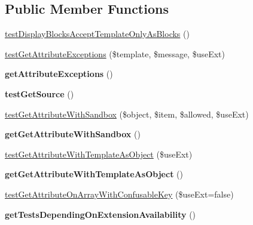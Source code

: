 \subsection*{Public Member Functions}
\begin{DoxyCompactItemize}
\item 
\hyperlink{classTwig__Tests__TemplateTest_a616e3dd27a87fa145276f1843568d180}{test\+Display\+Blocks\+Accept\+Template\+Only\+As\+Blocks} ()
\item 
\hyperlink{classTwig__Tests__TemplateTest_a203d0c14e730dc4385a8da7f78a789e9}{test\+Get\+Attribute\+Exceptions} (\$template, \$message, \$use\+Ext)
\item 
{\bfseries get\+Attribute\+Exceptions} ()\hypertarget{classTwig__Tests__TemplateTest_ab715715b3547c50918a3bacde5c01c6b}{}\label{classTwig__Tests__TemplateTest_ab715715b3547c50918a3bacde5c01c6b}

\item 
{\bfseries test\+Get\+Source} ()\hypertarget{classTwig__Tests__TemplateTest_a6916a32e0484bbf3fb1b6c1f16ddc2c4}{}\label{classTwig__Tests__TemplateTest_a6916a32e0484bbf3fb1b6c1f16ddc2c4}

\item 
\hyperlink{classTwig__Tests__TemplateTest_a95bc8d3e8c67696a9d63a2ee9eef031a}{test\+Get\+Attribute\+With\+Sandbox} (\$object, \$item, \$allowed, \$use\+Ext)
\item 
{\bfseries get\+Get\+Attribute\+With\+Sandbox} ()\hypertarget{classTwig__Tests__TemplateTest_ae9e0a51a3b515a52520e269f6d05d300}{}\label{classTwig__Tests__TemplateTest_ae9e0a51a3b515a52520e269f6d05d300}

\item 
\hyperlink{classTwig__Tests__TemplateTest_a37d5215dcaab1a59de4f8dc84ce78884}{test\+Get\+Attribute\+With\+Template\+As\+Object} (\$use\+Ext)
\item 
{\bfseries get\+Get\+Attribute\+With\+Template\+As\+Object} ()\hypertarget{classTwig__Tests__TemplateTest_a26c258f91f6b219cc4ef48420b0f90fb}{}\label{classTwig__Tests__TemplateTest_a26c258f91f6b219cc4ef48420b0f90fb}

\item 
\hyperlink{classTwig__Tests__TemplateTest_abebb9e29a923b474cc7197b268dacb17}{test\+Get\+Attribute\+On\+Array\+With\+Confusable\+Key} (\$use\+Ext=false)
\item 
{\bfseries get\+Tests\+Depending\+On\+Extension\+Availability} ()\hypertarget{classTwig__Tests__TemplateTest_a55adf34fc392086711338a3787815c16}{}\label{classTwig__Tests__TemplateTest_a55adf34fc392086711338a3787815c16}


\end{DoxyCompactItemize}
